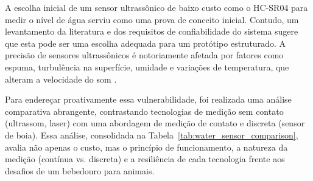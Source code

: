 A escolha inicial de um sensor ultrassônico de baixo custo como o HC-SR04 para medir o nível de água serviu como uma prova de conceito inicial.
Contudo, um levantamento da literatura e dos requisitos de confiabilidade do sistema sugere que esta pode ser uma escolha adequada para um protótipo estruturado.
A precisão de sensores ultrassônicos é notoriamente afetada por fatores como espuma, turbulência na superfície, umidade e variações de temperatura, que alteram a velocidade do som \cite{ultrasonic_foam, ultrasonic_limitations, ultrasonic_temp_humidity}.

Para endereçar proativamente essa vulnerabilidade, foi realizada uma análise comparativa abrangente, contrastando tecnologias de medição sem contato (ultrassom, laser) com uma abordagem de medição de contato e discreta (sensor de boia).
Essa análise, consolidada na Tabela~\ref{tab:water_sensor_comparison}, avalia não apenas o custo, mas o princípio de funcionamento, a natureza da medição (contínua vs. discreta) e a resiliência de cada tecnologia frente aos desafios de um bebedouro para animais.
